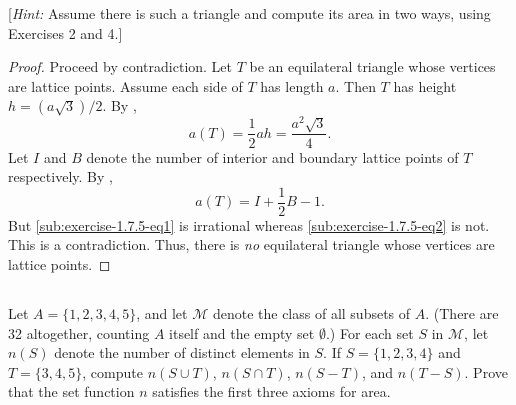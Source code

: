 \documentclass{report}
\begin{document}
[\textit{Hint:} Assume there is such a triangle and compute its area in two
ways, using Exercises 2 and 4.]

\begin{proof}

  Proceed by contradiction.
  Let $T$ be an equilateral triangle whose vertices are lattice points.
  Assume each side of $T$ has length $a$.
  Then $T$ has height $h = (a\sqrt{3}) / 2$.
  By ,
    \begin{equation}
      \label{sub:exercise-1.7.5-eq1}
      \tag{5.1}
      a(T) = \frac{1}{2}ah = \frac{a^2\sqrt{3}}{4}.
    \end{equation}
  Let $I$ and $B$ denote the number of interior and boundary lattice points of
    $T$ respectively.
  By ,
    \begin{equation}
      \label{sub:exercise-1.7.5-eq2}
      \tag{5.2}
      a(T) = I + \frac{1}{2}B - 1.
    \end{equation}
  But \eqref{sub:exercise-1.7.5-eq1} is irrational whereas
    \eqref{sub:exercise-1.7.5-eq2} is not.
  This is a contradiction.
  Thus, there is \textit{no} equilateral triangle whose vertices are lattice
    points.

\end{proof}

\subsection{}%
\label{sub:exercise-1.7.6}

Let $A = \{1, 2, 3, 4, 5\}$, and let $\mathscr{M}$ denote the class of all
  subsets of $A$.
(There are 32 altogether, counting $A$ itself and the empty set $\emptyset$.)
For each set $S$ in $\mathscr{M}$, let $n(S)$ denote the number of distinct
  elements in $S$.
If $S = \{1, 2, 3, 4\}$ and $T = \{3, 4, 5\}$, compute $n(S \cup T)$,
  $n(S \cap T)$, $n(S - T)$, and $n(T - S)$.
Prove that the set function $n$ satisfies the first three axioms for area.
\end{document}
